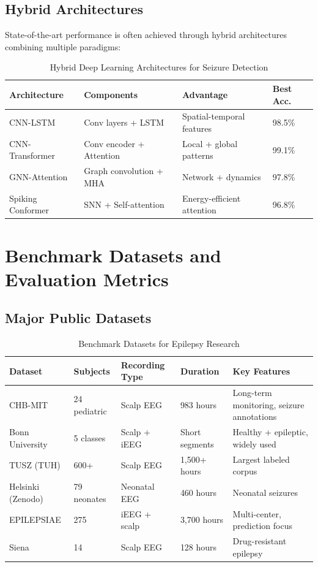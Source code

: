 \documentclass[12pt,a4paper]{article}
\begin{document}
\subsection{Hybrid Architectures}

State-of-the-art performance is often achieved through hybrid architectures combining multiple paradigms:

\begin{table}[H]
\centering
\caption{Hybrid Deep Learning Architectures for Seizure Detection}
\label{tab:hybrid}
\begin{tabular}{lp{4cm}ll}
\toprule
\textbf{Architecture} & \textbf{Components} & \textbf{Advantage} & \textbf{Best Acc.} \\
\midrule
CNN-LSTM & Conv layers + LSTM & Spatial-temporal features & 98.5\% \\
CNN-Transformer & Conv encoder + Attention & Local + global patterns & 99.1\% \\
GNN-Attention & Graph convolution + MHA & Network + dynamics & 97.8\% \\
Spiking Conformer & SNN + Self-attention & Energy-efficient attention & 96.8\% \\
\bottomrule
\end{tabular}
\end{table}

\section{Benchmark Datasets and Evaluation Metrics}

\subsection{Major Public Datasets}

\begin{table}[H]
\centering
\caption{Benchmark Datasets for Epilepsy Research}
\label{tab:datasets}
\begin{tabular}{lp{2cm}p{2cm}p{2cm}p{3.5cm}}
\toprule
\textbf{Dataset} & \textbf{Subjects} & \textbf{Recording Type} & \textbf{Duration} & \textbf{Key Features} \\
\midrule
CHB-MIT & 24 pediatric & Scalp EEG & 983 hours & Long-term monitoring, seizure annotations \\
Bonn University & 5 classes & Scalp + iEEG & Short segments & Healthy + epileptic, widely used \\
TUSZ (TUH) & 600+ & Scalp EEG & 1,500+ hours & Largest labeled corpus \\
Helsinki (Zenodo) & 79 neonates & Neonatal EEG & 460 hours & Neonatal seizures \\
EPILEPSIAE & 275 & iEEG + scalp & 3,700 hours & Multi-center, prediction focus \\
Siena & 14 & Scalp EEG & 128 hours & Drug-resistant epilepsy \\
\bottomrule
\end{tabular}
\end{table}
\end{document}
